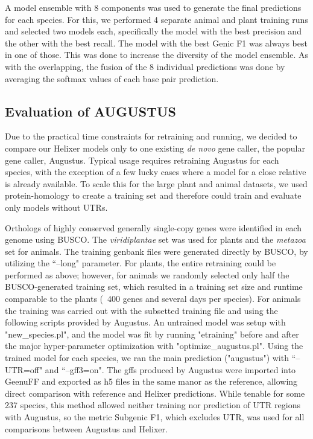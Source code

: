 \documentclass{bioinfo}
\begin{document}
\begin{methods}
A model ensemble with 8 components was used to generate the final predictions for 
each species. For this, we performed 4 separate animal and plant training runs and 
selected two models each, specifically the model with the best precision and the  %
other with the best recall. The model with the best Genic F1 was always best in one of 
those. This was done to increase the diversity of the model ensemble. As with the 
overlapping, the fusion of the 8 individual predictions was done by averaging the 
softmax values of each base pair prediction.

\subsection{Evaluation of AUGUSTUS} 
\label{sec:augustus}
Due to the practical time constraints for retraining and running, we decided to compare our Helixer
models only to one existing {\it de novo} gene caller, the popular gene caller, Augustus.
Typical usage requires retraining Augustus for each species, with the exception of a
few lucky cases where a model for a close relative is already available. To scale this for 
the large plant and animal datasets, we used protein-homology to create a training set and
therefore could train and evaluate only models without UTRs. 

Orthologs of highly conserved generally single-copy genes were identified in each genome using
BUSCO. The {\it viridiplantae} set was used for plants and the {\it metazoa} set for animals.
The training genbank files were generated directly by BUSCO, by utilizing the ``--long"  %
parameter. For plants, the entire retraining could be performed as above; however, for animals
we randomly selected only half the BUSCO-generated training set, which resulted in a training set 
size and runtime comparable to the plants (~400 genes and several days per species). For animals
the training was carried out with the subsetted training file and using the following scripts provided
by Augustus. An untrained model was setup with "new\_species.pl", and the model was fit by running
"etraining" before and after the major hyper-parameter optimization with "optimize\_augustus.pl".
Using the trained model for each species, we ran the main prediction ("augustus") with ``--UTR=off"
and ``--gff3=on". The gffs produced by Augustus were imported into GeenuFF and exported as h5
files in the same manor as the reference, allowing direct comparison with reference and 
Helixer predictions. While tenable for some 237 species, this method allowed neither training
nor prediction of UTR regions with Augustus, so the metric Subgenic F1, which excludes UTR,
was used for all comparisons between Augustus and Helixer.


\end{methods}
\end{document}
